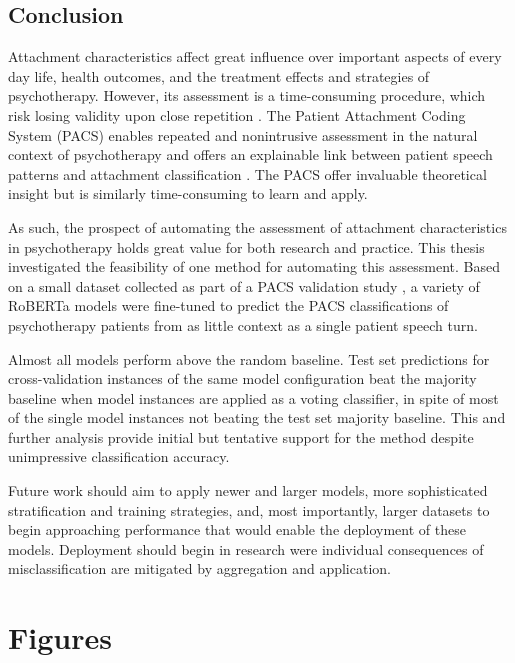 \documentclass[12pt]{report}
\begin{document}
\section{Conclusion}
Attachment characteristics affect great influence over important aspects of every day life, health outcomes, and the treatment effects and strategies of psychotherapy.
However, its assessment is a time-consuming procedure, which risk losing validity upon close repetition \cite{Daniel2015,Hesse1999}.
The Patient Attachment Coding System (PACS) enables repeated and nonintrusive assessment in the natural context of psychotherapy and offers an explainable link between patient speech patterns and attachment classification \cite{Talia2017,Talia2014}.
The PACS offer invaluable theoretical insight but is similarly time-consuming to learn and apply.

As such, the prospect of automating the assessment of attachment characteristics in psychotherapy holds great value for both research and practice.
This thesis investigated the feasibility of one method for automating this assessment.
Based on a small dataset collected as part of a PACS validation study \cite{Talia2017}, a variety of RoBERTa models \cite{roberta} were fine-tuned to predict the PACS classifications of psychotherapy patients from as little context as a single patient speech turn.

Almost all models perform above the random baseline.
Test set predictions for cross-validation instances of the same model configuration beat the majority baseline when model instances are applied as a voting classifier, in spite of most of the single model instances not beating the test set majority baseline.
This and further analysis provide initial but tentative support for the method despite unimpressive classification accuracy.

Future work should aim to apply newer and larger models, more sophisticated stratification and training strategies, and, most importantly, larger datasets to begin approaching performance that would enable the deployment of these models.
Deployment should begin in research were individual consequences of misclassification are mitigated by aggregation and application.



\appendix
\chapter{Figures}
\label{App: Figures}
\end{document}
